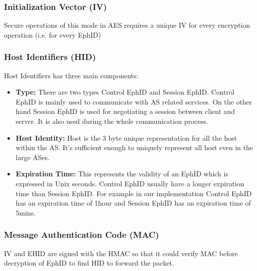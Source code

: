 \subsubsection{Initialization Vector (IV)}
Secure operations of this mode in AES requires a unique IV for every encryption operation (i.e. for every EphID)

\subsubsection{Host Identifiers (HID)}
\begin{center}
\end{center}
Host Identifiers has three main components:
\begin{itemize}
    \item \textbf{Type:} There are two types Control EphID and Session EphID. Control EphID is mainly used to communicate with AS related services. On the other hand Session EphID is used for negotiating a session between client and server. It is also used during the whole communication process.
    \item \textbf{Host Identity:} Host is the 3 byte unique representation for all the host within the AS. It's sufficient enough to uniquely represent all host even in the large ASes.
    \item \textbf{Expiration Time:} This represents the validity of an EphID which is expressed in Unix seconds. Control EphID usually have a longer expiration time than Session EphID. For example in our implementation Control EphID has an expiration time of 1hour and Session EphID has an expiration time of 5mins.
\end{itemize}

\subsubsection{Message Authentication Code (MAC)}
IV and EHID are signed with the HMAC so that it could verify MAC before decryption of EphID to find HID to forward the packet.

